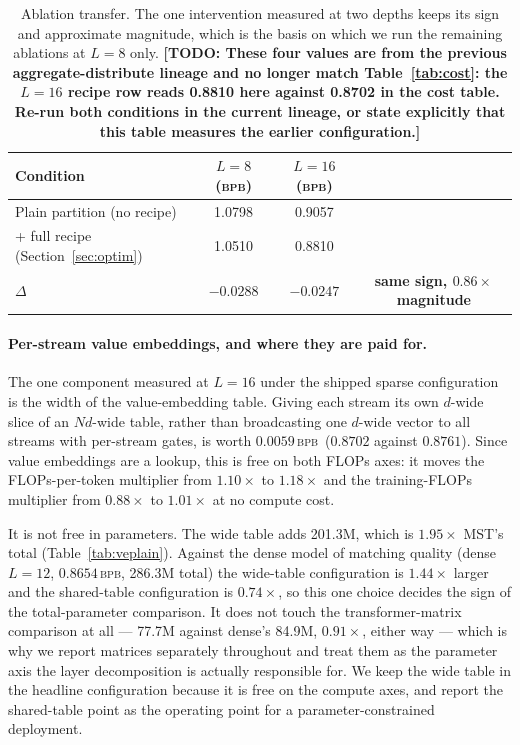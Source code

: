 \documentclass{article}
\newcommand{\TODO}[1]{{\color{red}\textbf{[TODO: #1]}}}
\newcommand{\bpb}{\textsc{bpb}}
\newcommand{\dsub}{d}
\newcommand{\nsub}{N}
\begin{document}
\begin{table}[t]
\caption{Ablation transfer. The one intervention measured at two depths keeps its
sign and approximate magnitude, which is the basis on which we run the remaining
ablations at $L{=}8$ only. \TODO{These four values are from the previous
aggregate-distribute lineage and no longer match Table~\ref{tab:cost}: the
$L{=}16$ recipe row reads 0.8810 here against 0.8702 in the cost table. Re-run
both conditions in the current lineage, or state explicitly that this table
measures the earlier configuration.}}
\label{tab:transfer}
\begin{center}
\begin{small}
\begin{tabular}{lccc}
\toprule
Condition & $L{=}8$ (\bpb) & $L{=}16$ (\bpb) & \\
\midrule
Plain partition (no recipe)          & 1.0798 & 0.9057 & \\
\; + full recipe (Section~\ref{sec:optim}) & 1.0510 & 0.8810 & \\
\midrule
$\Delta$                              & $-0.0288$ & $-0.0247$ & \textbf{same sign, $0.86\times$ magnitude} \\
\bottomrule
\end{tabular}
\end{small}
\end{center}
\end{table}

\paragraph{Per-stream value embeddings, and where they are paid for.} The one
component measured at $L{=}16$ under the shipped sparse configuration is the width
of the value-embedding table. Giving each stream its own $\dsub$-wide slice of an
$\nsub\dsub$-wide table, rather than broadcasting one $\dsub$-wide vector to all
streams with per-stream gates, is worth $0.0059$\,\bpb\ ($0.8702$ against
$0.8761$). Since value embeddings are a lookup, this is free on both FLOPs axes:
it moves the FLOPs-per-token multiplier from $1.10\times$ to $1.18\times$ and the
training-FLOPs multiplier from $0.88\times$ to $1.01\times$ at no compute cost.

It is not free in parameters. The wide table adds 201.3M, which is $1.95\times$
MST's total (Table~\ref{tab:veplain}). Against the dense model of matching quality
(dense $L{=}12$, $0.8654$\,\bpb, 286.3M total) the wide-table configuration is
$1.44\times$ larger and the shared-table configuration is $0.74\times$, so this
one choice decides the sign of the total-parameter comparison. It does not touch
the transformer-matrix comparison at all --- 77.7M against dense's 84.9M,
$0.91\times$, either way --- which is why we report matrices separately throughout
and treat them as the parameter axis the layer decomposition is actually
responsible for. We keep the wide table in the headline configuration because it
is free on the compute axes, and report the shared-table point as the operating
point for a parameter-constrained deployment.
\end{document}
